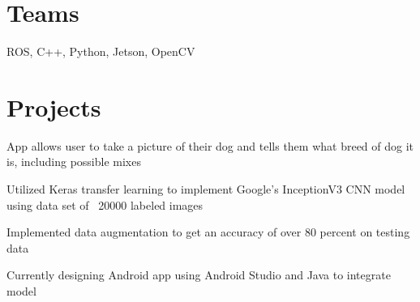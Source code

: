 \documentclass[]{deedy-resume-openfont}
\begin{document}
\begin{minipage}[t]{0.66\textwidth}

\section{Teams}
\begin{tightemize}
\item ROS, C++, Python, Jetson, OpenCV
\end{tightemize}
\sectionsep


\section{Projects}
\begin{tightemize}
\item App allows user to take a picture of their dog and tells them what breed of dog it is, including possible mixes
\item Utilized Keras transfer learning to implement Google's InceptionV3 CNN model using data set of ~20000 labeled images
\item Implemented data augmentation to get an accuracy of over 80 percent on testing data
\item Currently designing Android app using Android Studio and Java to integrate model
\end{tightemize}
\sectionsep


\end{minipage} 
\end{document}
